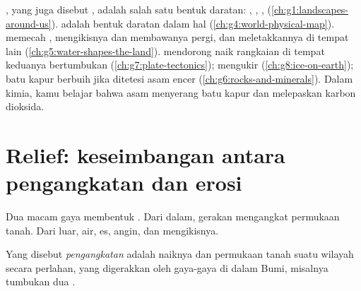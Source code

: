 \begin{recall}
\emph{}, yang juga disebut , adalah salah satu
bentuk daratan: , , , 
(\cref{ch:g1:landscapes-around-us}).  adalah bentuk
daratan dalam hal  (\cref{ch:g4:world-physical-map}).
 memecah ,  mengikisnya dan membawanya pergi, dan
 meletakkannya di tempat lain
(\cref{ch:g5:water-shapes-the-land}).  mendorong naik
rangkaian  di tempat keduanya bertumbukan
(\cref{ch:g7:plate-tectonics});  mengukir 
(\cref{ch:g8:ice-on-earth}); batu kapur berbuih jika ditetesi asam encer
(\cref{ch:g6:rocks-and-minerals}). Dalam kimia, kamu belajar bahwa asam
menyerang batu kapur dan melepaskan karbon dioksida.
\end{recall}

\section{Relief: keseimbangan antara pengangkatan dan erosi}

Dua macam gaya membentuk . Dari dalam, gerakan 
mengangkat permukaan tanah. Dari luar, air, es, angin, dan 
mengikisnya.

\begin{definition}[Pengangkatan]\label{def:g9:landforms:uplift}
Yang disebut \emph{pengangkatan} adalah naiknya
 dan permukaan tanah suatu wilayah secara perlahan, yang digerakkan
oleh gaya-gaya di dalam Bumi, misalnya tumbukan dua .
\end{definition}

